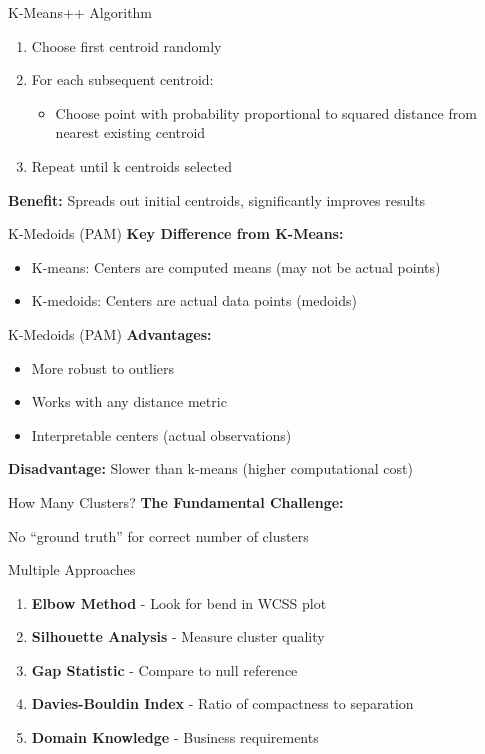 \documentclass[aspectratio=169,ignorenonframetext]{beamer}
\begin{document}
\begin{frame}{K-Means++ Algorithm}
\begin{enumerate}
\item
  Choose first centroid randomly
\item
  For each subsequent centroid:

  \begin{itemize}
  \item
    Choose point with probability proportional to squared distance from
    nearest existing centroid
  \end{itemize}
\item
  Repeat until k centroids selected
\end{enumerate}

\textbf{Benefit:} Spreads out initial centroids, significantly improves
results
\end{frame}

\begin{frame}{K-Medoids (PAM)}
\textbf{Key Difference from K-Means:}

\begin{itemize}
\item
  K-means: Centers are computed means (may not be actual points)
\item
  K-medoids: Centers are actual data points (medoids)
\end{itemize}
\end{frame}

\begin{frame}{K-Medoids (PAM)}
\textbf{Advantages:}

\begin{itemize}
\item
  More robust to outliers
\item
  Works with any distance metric
\item
  Interpretable centers (actual observations)
\end{itemize}

\textbf{Disadvantage:} Slower than k-means (higher computational cost)
\end{frame}

\begin{frame}{How Many Clusters?}
\textbf{The Fundamental Challenge:}

No ``ground truth'' for correct number of clusters
\end{frame}

\begin{frame}{Multiple Approaches}
\begin{enumerate}
\item
  \textbf{Elbow Method} - Look for bend in WCSS plot
\item
  \textbf{Silhouette Analysis} - Measure cluster quality
\item
  \textbf{Gap Statistic} - Compare to null reference
\item
  \textbf{Davies-Bouldin Index} - Ratio of compactness to separation
\item
  \textbf{Domain Knowledge} - Business requirements
\end{enumerate}
\end{frame}
\end{document}
